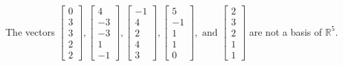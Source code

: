 \begin{exercise}
\begin{exerciseStatement}
  \end{exerciseStatement}
  \begin{exerciseAnswer}
   The vectors \(\left[\begin{array}{r}
0 \\
3 \\
3 \\
2 \\
2
\end{array}\right] , \left[\begin{array}{r}
4 \\
-3 \\
-3 \\
1 \\
-1
\end{array}\right] , \left[\begin{array}{r}
-1 \\
4 \\
2 \\
4 \\
3
\end{array}\right] , \left[\begin{array}{r}
5 \\
-1 \\
1 \\
1 \\
0
\end{array}\right] , \text{ and } \left[\begin{array}{r}
2 \\
3 \\
2 \\
1 \\
1
\end{array}\right]\) 
  	 are not  a basis of \(\mathbb{R}^5\).
  


  \end{exerciseAnswer}
\end{exercise}